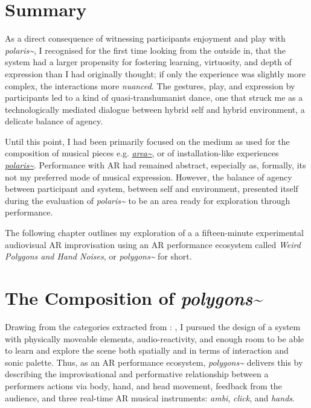 \clearpage
\section{Summary}\label{sec: polygons-developing}
As a direct consequence of witnessing participants enjoyment and play with \textit{polaris\textasciitilde{}}, I recognised for the first time looking from the outside in, that the system had a larger propensity for fostering learning, virtuosity, and depth of expression than I had originally thought; if only the experience was slightly more complex, the interactions more \textit{nuanced}. The gestures, play, and expression by participants led to a kind of quasi-transhumanist dance, one that struck me as a technologically mediated dialogue between hybrid self and hybrid environment, a delicate balance of agency.



Until this point, I had been primarily focused on the medium as used for the composition of musical pieces e.g. \hyperref[sec: area]{\textit{area\textasciitilde{}}}, or of installation-like experiences \hyperref[sec: polaris]{\textit{polaris\textasciitilde{}}}. Performance with AR had remained abstract, especially as, formally, its not my preferred mode of musical expression. However, the balance of agency between participant and system, between self and environment, presented itself during the evaluation of \textit{polaris\textasciitilde{}} to be an area ready for exploration through performance. 

The following chapter outlines my exploration of a a fifteen-minute experimental audiovisual AR improvisation using an AR performance ecosystem called \textit{Weird Polygons and Hand Noises}, or \textit{polygons\textasciitilde{}} for short.



\section{The Composition of \textit{polygons\textasciitilde{}}}\label{sec: polygons-composition}

Drawing from the categories extracted from : , I pursued the design of a system with physically moveable elements, audio-reactivity, and enough room to be able to learn and explore the scene both spatially and in terms of interaction and sonic palette. Thus, as an AR performance ecosystem, \textit{polygons\textasciitilde{}} delivers this by describing the improvisational and performative relationship between a performers actions via body, hand, and head movement, feedback from the audience, and three real-time AR musical instruments: \textit{ambi}, \textit{click}, and \textit{hands}. 

